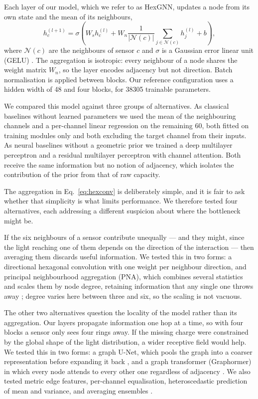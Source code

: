 \documentclass[10pt,conference]{IEEEtran}
\begin{document}
Each layer of our model, which we refer to as HexGNN, updates a node from its
own state and the mean of its neighbours,
%
\begin{equation}
h_{c}^{(l+1)} = \sigma\!\left( W_{s} h_{c}^{(l)}
  + W_{n} \frac{1}{|\mathcal{N}(c)|} \sum_{j \in \mathcal{N}(c)} h_{j}^{(l)}
  + b \right),
\label{eq:hexconv}
\end{equation}
%
where $\mathcal{N}(c)$ are the neighbours of sensor $c$ and $\sigma$ is a Gaussian error
linear unit (GELU) \cite{hendrycks2016gelu}. The aggregation is isotropic: every
neighbour of a node shares the weight matrix $W_{n}$, so the layer encodes
adjacency but not direction. Batch normalisation \cite{ioffe2015batchnorm} is
applied between blocks. Our reference configuration uses a hidden width of 48
and four blocks, for \num{38305} trainable parameters.

We compared this model against three groups of alternatives. As classical
baselines without learned parameters we used the mean of the neighbouring
channels and a per-channel linear regression on the remaining 60, both fitted
on training modules only and both excluding the target channel from their
inputs. As neural baselines without a geometric prior we trained a deep multilayer
perceptron and a residual multilayer perceptron with channel attention. Both
receive the same information but no notion of adjacency, which isolates the
contribution of the prior from that of raw capacity.


The aggregation in Eq.~\ref{eq:hexconv} is deliberately simple, and it is fair
to ask whether that simplicity is what limits performance. We therefore tested
four alternatives, each addressing a different suspicion about where the
bottleneck might be.

If the six neighbours of a sensor contribute unequally --- and they might, since
the light reaching one of them depends on the direction of the interaction ---
then averaging them discards useful information. 
We tested this in two forms: a directional hexagonal convolution with one weight per neighbour direction,
and principal neighbourhood aggregation (PNA), which combines several statistics and
scales them by node degree, retaining information that any single one throws
away \cite{corso2020pna}; degree varies here between three and six, so the
scaling is not vacuous.

The other two alternatives question the locality of the model rather than its
aggregation. Our layers propagate information one hop at a time, so with four
blocks a sensor only sees four rings away. If the missing charge were
constrained by the global shape of the light distribution, a wider receptive
field would help. We tested this in two forms: a graph U-Net, which pools the
graph into a coarser representation before expanding it back
\cite{gao2019graphunet}, and a graph transformer (Graphormer) in which every
node attends to every other one regardless of adjacency
\cite{ying2021graphormer}. We also tested metric edge features, per-channel
equalisation, heteroscedastic prediction of mean and variance, and averaging
ensembles \cite{lakshminarayanan2017ensembles}.
\end{document}
